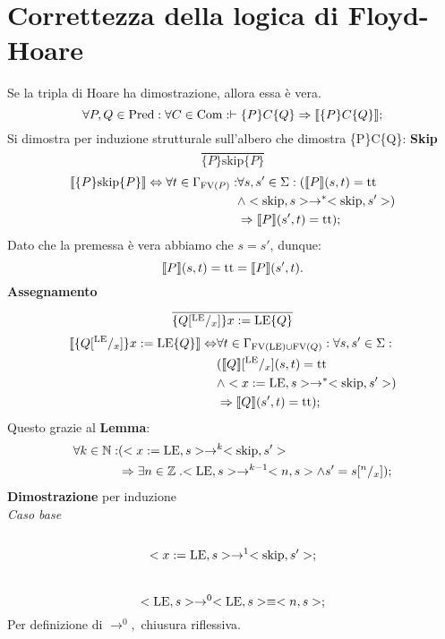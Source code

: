 \documentclass[a4paper, 12pt, oneside,fleqn]{book}
\begin{document}
\section{Correttezza della logica di Floyd-Hoare}
Se la tripla di Hoare ha dimostrazione, allora essa è vera.
$$\forall P,Q \in \mathrm{Pred} \mathrel{:} \forall C \in \mathrm{Com} : \vdash\{P\}C\{Q\} \Rightarrow \llbracket \{P\}C\{Q\}\rrbracket;$$
Si dimostra per induzione strutturale sull'albero che dimostra \{P\}C\{Q\}:
\textbf{Skip}
$$\frac{}{\{P\}\mathrm{skip}\{P\}}$$
\begin{align*}
\llbracket \{P\}\mathrm{skip}\{P\} \rrbracket \Leftrightarrow \forall t \in \Gamma_{\mathrm{FV}(P)}\mathrel{:}
&\forall s,s'\in \Sigma \mathrel{:}(\llbracket P \rrbracket(s,t) = \mathrm{tt} \\
&\wedge <\mathrm{skip},s>\rightarrow ^*<\mathrm{skip},s'>)\\
&\Rightarrow\llbracket P \rrbracket(s',t)=\mathrm{tt});
\end{align*}
Dato che la premessa è vera abbiamo che $s=s'$, dunque:
$$\llbracket P \rrbracket(s,t)=\mathrm{tt} =\llbracket P \rrbracket(s',t).$$
\textbf{Assegnamento}
$$\frac{}{\{Q[^{\mathrm{LE}}/_x]\}x:=\mathrm{LE}\{Q\}}$$
\begin{align*}
\llbracket \{Q[^{\mathrm{LE}}/_x]\}x:=\mathrm{LE}\{Q\} \rrbracket \Leftrightarrow
&\forall t \in \Gamma_{\mathrm{FV}(\mathrm{LE})\cup \mathrm{FV}(Q)}\mathrel{:}\forall s,s'\in \Sigma \mathrel{:}\\
&(\llbracket Q \rrbracket[^{\mathrm{LE}}/_x](s,t) = \mathrm{tt}\\
&\wedge <x:=\mathrm{LE},s>\rightarrow ^*<\mathrm{skip},s'>)\\
&\Rightarrow\llbracket Q \rrbracket(s',t)=\mathrm{tt});
\end{align*}
Questo grazie al \textbf{Lemma}:
\begin{align*}
\forall  k \in \mathbb{N} \mathrel{:}
&(<x:=\mathrm{LE},s> \rightarrow ^k<\mathrm{skip},s'>\\
&\Rightarrow \exists n \in \mathbb{Z}\mathrel{.} <\mathrm{LE},s>\rightarrow ^{k-1}<n,s>\wedge s'=s[^n/_x]);
\end{align*}
\textbf{Dimostrazione} per induzione\\
\textit{Caso base}\\
\\
$$<x:=\mathrm{LE},s>\rightarrow ^1<\mathrm{skip},s'>;$$
\\
$$<\mathrm{LE},s>\rightarrow ^0<\mathrm{LE},s> \equiv <n,s>;$$
Per definizione di $\rightarrow ^0,$ chiusura riflessiva.\\
\end{document}
